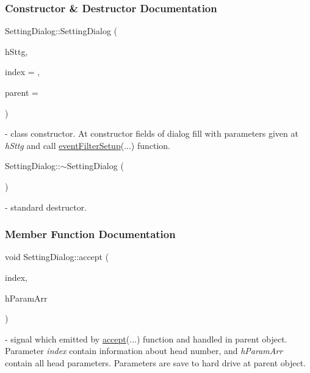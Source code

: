 \subsubsection{Constructor \& Destructor Documentation}
\mbox{\label{classSettingDialog_ab7c9f7de85d73ca64b847ca3a0cd422a}} 
{\footnotesize\ttfamily Setting\+Dialog\+::\texorpdfstring{Setting\+Dialog}{SettingDialog} (\begin{DoxyParamCaption}\item[{\mbox{\hyperlink{classHeadSetting}{Head\+Setting}}}]{h\+Sttg,  }\item[{int}]{index = {},  }\item[{Q\+Widget $\ast$}]{parent = {} }\end{DoxyParamCaption})\hspace{0.3cm}{\ttfamily [explicit]}} - class constructor. At constructor fields of dialog fill with parameters given at \textit{hSttg} and call \hyperlink{classSettingDialog_a01d7341608bd80021abd1a5892fdb131}{event\+Filter\+Setup}(...) function.

\mbox{\label{classSettingDialog_a9bfa278550d23df3f5e944989b0b0f54}} 
{\footnotesize\ttfamily Setting\+Dialog\+::\texorpdfstring{$\sim$\+Setting\+Dialog}{~SettingDialog} (\begin{DoxyParamCaption}{ }\end{DoxyParamCaption})} - standard destructor.



\subsubsection{Member Function Documentation}
\mbox{\label{classSettingDialog_abaf35d57bd061500e4d06c86bd9b7373}} 
{\footnotesize\ttfamily void Setting\+Dialog\+::\texorpdfstring{accept}{accept}\hspace{0.1cm} (\begin{DoxyParamCaption}\item[{int}]{index,  }\item[{Q\+Byte\+Array}]{h\+Param\+Arr }\end{DoxyParamCaption})\hspace{0.3cm}{\ttfamily [signal]}} - signal which emitted by \hyperlink{classSettingDialog_ac5caf772c1ad7d7607a164ad7f6fe647}{accept}(...) function and handled in parent object. Parameter \textit{index} contain information about head number, and \textit{h\+Param\+Arr} contain all head parameters. Parameters are save to hard drive at parent object.

